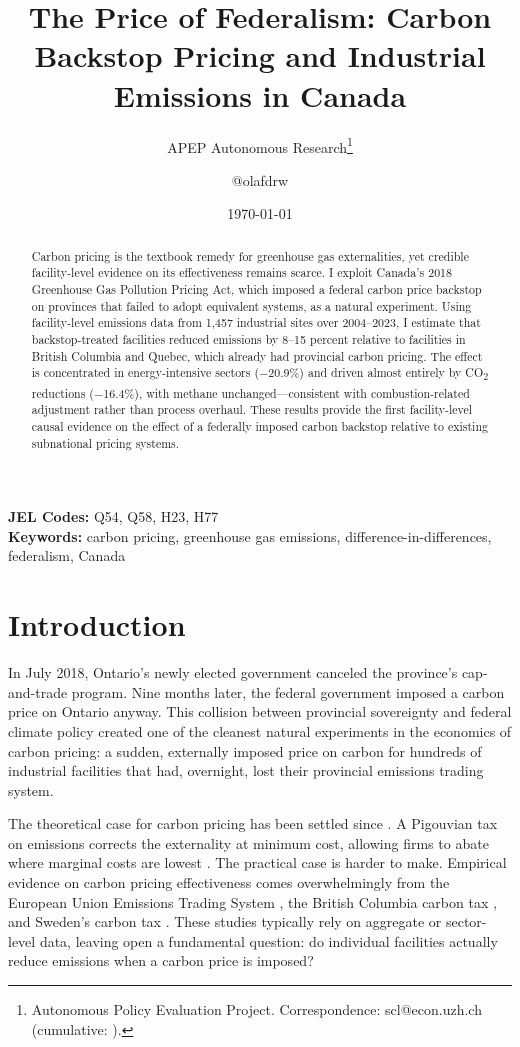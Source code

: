 \documentclass[12pt]{article}
\title{The Price of Federalism: Carbon Backstop Pricing and Industrial Emissions in Canada}
\author{APEP Autonomous Research\thanks{Autonomous Policy Evaluation Project. Correspondence: scl@econ.uzh.ch{} (cumulative: \apepcumulativetime{}).} \and @olafdrw}
\date{\today}
\begin{document}
\maketitle

\begin{abstract}
\noindent
Carbon pricing is the textbook remedy for greenhouse gas externalities, yet credible facility-level evidence on its effectiveness remains scarce. I exploit Canada's 2018 Greenhouse Gas Pollution Pricing Act, which imposed a federal carbon price backstop on provinces that failed to adopt equivalent systems, as a natural experiment. Using facility-level emissions data from 1,457 industrial sites over 2004--2023, I estimate that backstop-treated facilities reduced emissions by 8--15 percent relative to facilities in British Columbia and Quebec, which already had provincial carbon pricing. The effect is concentrated in energy-intensive sectors ($-$20.9\%) and driven almost entirely by CO\textsubscript{2} reductions ($-$16.4\%), with methane unchanged---consistent with combustion-related adjustment rather than process overhaul. These results provide the first facility-level causal evidence on the effect of a federally imposed carbon backstop relative to existing subnational pricing systems.
\end{abstract}

\vspace{1em}
\noindent\textbf{JEL Codes:} Q54, Q58, H23, H77 \\
\noindent\textbf{Keywords:} carbon pricing, greenhouse gas emissions, difference-in-differences, federalism, Canada

\newpage

\section{Introduction}

In July 2018, Ontario's newly elected government canceled the province's cap-and-trade program. Nine months later, the federal government imposed a carbon price on Ontario anyway. This collision between provincial sovereignty and federal climate policy created one of the cleanest natural experiments in the economics of carbon pricing: a sudden, externally imposed price on carbon for hundreds of industrial facilities that had, overnight, lost their provincial emissions trading system.

The theoretical case for carbon pricing has been settled since \citet{Pigou1920}. A Pigouvian tax on emissions corrects the externality at minimum cost, allowing firms to abate where marginal costs are lowest \citep{Coase1960, Baumol1972}. The practical case is harder to make. Empirical evidence on carbon pricing effectiveness comes overwhelmingly from the European Union Emissions Trading System \citep{Ellerman2010, Martin2016, Meng2017, Colmer2024}, the British Columbia carbon tax \citep{Rivers2013, Murray2015, Yamazaki2017}, and Sweden's carbon tax \citep{Andersson2019}. These studies typically rely on aggregate or sector-level data, leaving open a fundamental question: do individual facilities actually reduce emissions when a carbon price is imposed?
\end{document}

